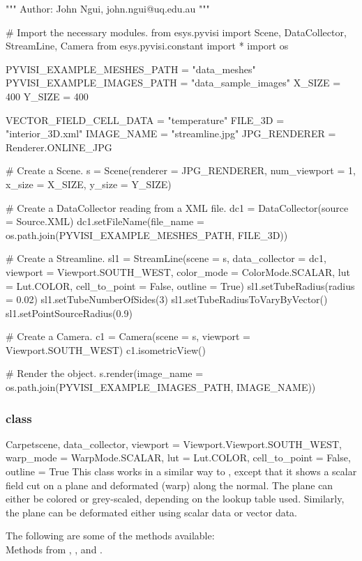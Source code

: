 \begin{python}
"""
Author: John Ngui, john.ngui@uq.edu.au
"""

# Import the necessary modules.
from esys.pyvisi import Scene, DataCollector, StreamLine, Camera 
from esys.pyvisi.constant import *
import os

PYVISI_EXAMPLE_MESHES_PATH = "data_meshes"
PYVISI_EXAMPLE_IMAGES_PATH = "data_sample_images"
X_SIZE = 400
Y_SIZE = 400

VECTOR_FIELD_CELL_DATA = "temperature"
FILE_3D = "interior_3D.xml"
IMAGE_NAME = "streamline.jpg"
JPG_RENDERER = Renderer.ONLINE_JPG

# Create a Scene.
s = Scene(renderer = JPG_RENDERER, num_viewport = 1, x_size = X_SIZE, 
        y_size = Y_SIZE)

# Create a DataCollector reading from a XML file.
dc1 = DataCollector(source = Source.XML)
dc1.setFileName(file_name = os.path.join(PYVISI_EXAMPLE_MESHES_PATH, FILE_3D))

# Create a Streamline.
sl1 = StreamLine(scene = s, data_collector = dc1,
        viewport = Viewport.SOUTH_WEST, color_mode = ColorMode.SCALAR, 
        lut = Lut.COLOR, cell_to_point = False, outline = True)
sl1.setTubeRadius(radius = 0.02)
sl1.setTubeNumberOfSides(3)
sl1.setTubeRadiusToVaryByVector()
sl1.setPointSourceRadius(0.9)

# Create a Camera.
c1 = Camera(scene = s, viewport = Viewport.SOUTH_WEST)
c1.isometricView()

# Render the object.
s.render(image_name = os.path.join(PYVISI_EXAMPLE_IMAGES_PATH, IMAGE_NAME))
\end{python}

\subsubsection{\Carpet class}

\begin{classdesc}{Carpet}{scene, data_collector,
viewport = Viewport.Viewport.SOUTH_WEST, warp_mode = WarpMode.SCALAR, 
lut = Lut.COLOR, cell_to_point = False, outline = True}
This class works in a similar way to \MapOnPlaneCut, except that it shows a 
scalar field cut on a plane and deformated (warp) along the normal. The 
plane can either be colored or grey-scaled, depending on the lookup table used. 
Similarly, the plane can be deformated either using scalar data or vector data.
\end{classdesc}

The following are some of the methods available:\\
Methods from \ActorThreeD, \Warp, \Transform and \DataSetMapper.


